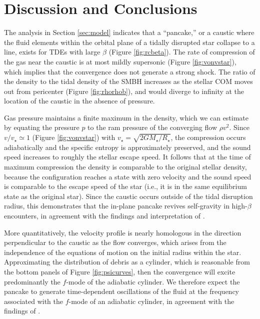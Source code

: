 \documentclass[twocolumn]{aastex62}
\begin{document}
\section{Discussion and Conclusions}
\label{sec:discussion}
The analysis in Section \ref{sec:model} indicates that a ``pancake,'' or a caustic where the fluid elements within the orbital plane of a tidally disrupted star collapse to a line, exists for TDEs with large $\beta$ (Figure \ref{fig:rcbeta}). The rate of compression of the gas near the caustic is at most mildly supersonic (Figure \ref{fig:vonvstar}), which implies that the convergence does not generate a strong shock. The ratio of the density to the tidal density of the SMBH increases as the stellar COM moves out from pericenter (Figure \ref{fig:rhorhob}), and would diverge to infinity at the location of the caustic in the absence of pressure.

Gas pressure maintains a finite maximum in the density, which we can estimate by equating the pressure $p$ to the ram pressure of the converging flow $\rho v^2$. Since $v / v_{\star} \simeq 1$ (Figure \ref{fig:vonvstar}) with $v_{\star} = \sqrt{2GM_{\star}/R_{\star}}$, the compression occurs adiabatically and the specific entropy is approximately preserved, and the sound speed increases to roughly the stellar escape speed. It follows that at the time of maximum compression the density is comparable to the original stellar density, because the configuration reaches a state with zero velocity and the sound speed is comparable to the escape speed of the star (i.e., it is in the same equilibrium state as the original star). Since the caustic occurs outside of the tidal disruption radius, this demonstrates that the in-plane pancake revives self-gravity in high-$\beta$ encounters, in agreement with the findings and interpretation of \citet{steinberg19}. 

More quantitatively, the velocity profile is nearly homologous in the direction perpendicular to the caustic as the flow converges, which arises from the independence of the equations of motion on the initial radius within the star. Approximating the distribution of debris as a cylinder, which is reasonable from the bottom panels of Figure \ref{fig:psicurves}, then the convergence will excite predominantly the $f$-mode of the adiabatic cylinder. We therefore expect the pancake to generate time-dependent oscillations of the fluid at the frequency associated with the $f$-mode of an adiabatic cylinder, in agreement with the findings of \citet[see their Figure 4]{coughlin20b}. 
\end{document}
